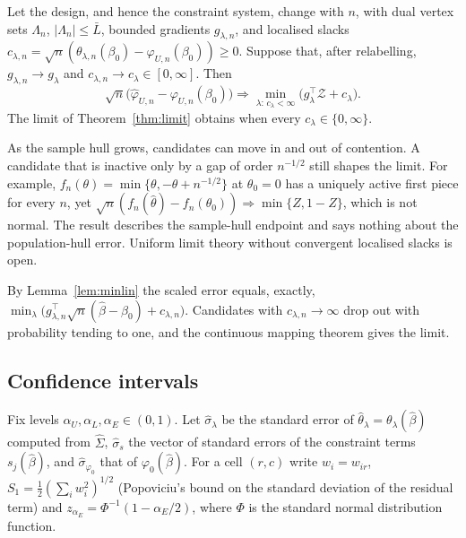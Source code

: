 \begin{proposition}\label{prop:triangular}
Let the design, and hence the constraint system, change with $n$, with dual vertex
sets $\Lambda_n$, $|\Lambda_n|\le\bar L$, bounded gradients $g_{\lambda,n}$, and
localised slacks $c_{\lambda,n}=\sqrt n(\theta_{\lambda,n}(\beta_0)-\varphi_{U,n}(\beta_0))\ge0$.
Suppose that, after relabelling, $g_{\lambda,n}\to g_\lambda$ and
$c_{\lambda,n}\to c_\lambda\in[0,\infty]$. Then
\[
\sqrt n\big(\hat\varphi_{U,n}-\varphi_{U,n}(\beta_0)\big)\Rightarrow\min_{\lambda:\,c_\lambda<\infty}\big(g_\lambda^\top\mathcal Z+c_\lambda\big).
\]
The limit of Theorem~\ref{thm:limit} obtains when every $c_\lambda\in\{0,\infty\}$.
\end{proposition}
\begin{reading}
As the sample hull grows, candidates can move in and out of contention. A
candidate that is inactive only by a gap of order $n^{-1/2}$ still shapes the
limit. For example, $f_n(\theta)=\min\{\theta,-\theta+n^{-1/2}\}$ at $\theta_0=0$ has a
uniquely active first piece for every $n$, yet
$\sqrt n(f_n(\hat\theta)-f_n(\theta_0))\Rightarrow\min\{Z,1-Z\}$, which is not normal.
The result describes the sample-hull endpoint and says nothing about the
population-hull error. Uniform limit theory without convergent localised slacks is
open.
\end{reading}
\begin{sketch}
By Lemma~\ref{lem:minlin} the scaled error equals, exactly,
$\min_\lambda\big(g_{\lambda,n}^\top\sqrt n(\hat\beta-\beta_0)+c_{\lambda,n}\big)$.
Candidates with $c_{\lambda,n}\to\infty$ drop out with probability tending to one,
and the continuous mapping theorem gives the limit.
\end{sketch}

\subsection{Confidence intervals}\label{sec:ci}

Fix levels $\alpha_U,\alpha_L,\alpha_E\in(0,1)$. Let $\hat\sigma_\lambda$ be the
standard error of $\hat\theta_\lambda=\theta_\lambda(\hat\beta)$ computed from
$\hat\Sigma$, $\hat\sigma_s$ the vector of standard errors of the constraint terms
$s_j(\hat\beta)$, and $\hat\sigma_{\varphi_0}$ that of $\varphi_0(\hat\beta)$. For a cell
$(r,c)$ write $w_i=w_{ir}$, $S_1=\tfrac12(\sum_iw_i^2)^{1/2}$ (Popoviciu's bound
on the standard deviation of the residual term) and $z_{\alpha_E}=\Phi^{-1}(1-\alpha_E/2)$,
where $\Phi$ is the standard normal distribution function.

